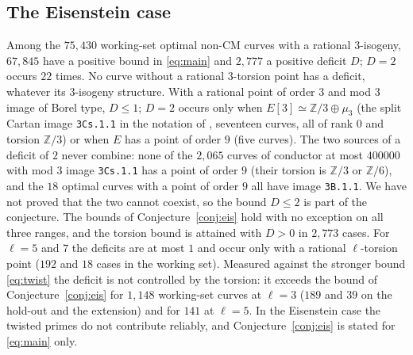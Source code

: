 \documentclass[11pt]{amsart}
\theoremstyle{definition}
\newcommand{\Z}{\mathbb{Z}}
\begin{document}
\subsection{The Eisenstein case}\label{sec:eis}
Among the $75{,}430$ working-set optimal non-CM curves with a rational $3$-isogeny, $67{,}845$ have a positive bound in \eqref{eq:main} and $2{,}777$ a positive deficit $D$; $D=2$ occurs $22$ times. No curve without a rational $3$-torsion point has a deficit, whatever its $3$-isogeny structure. With a rational point of order $3$ and mod $3$ image of Borel type, $D\le1$; $D=2$ occurs only when $E[3]\simeq\Z/3\oplus\mu_3$ (the split Cartan image \texttt{3Cs.1.1} in the notation of \cite{Sutherland16}, seventeen curves, all of rank $0$ and torsion $\Z/3$) or when $E$ has a point of order $9$ (five curves). The two sources of a deficit of $2$ never combine: none of the $2{,}065$ curves of conductor at most $400000$ with mod $3$ image \texttt{3Cs.1.1} has a point of order $9$ (their torsion is $\Z/3$ or $\Z/6$), and the $18$ optimal curves with a point of order $9$ all have image \texttt{3B.1.1}. We have not proved that the two cannot coexist, so the bound $D\le2$ is part of the conjecture. The bounds of Conjecture~\ref{conj:eis} hold with no exception on all three ranges, and the torsion bound is attained with $D>0$ in $2{,}773$ cases. For $\ell=5$ and $7$ the deficits are at most $1$ and occur only with a rational $\ell$-torsion point ($192$ and $18$ cases in the working set). Measured against the stronger bound \eqref{eq:twist} the deficit is not controlled by the torsion: it exceeds the bound of Conjecture~\ref{conj:eis} for $1{,}148$ working-set curves at $\ell=3$ ($189$ and $39$ on the hold-out and the extension) and for $141$ at $\ell=5$. In the Eisenstein case the twisted primes do not contribute reliably, and Conjecture~\ref{conj:eis} is stated for \eqref{eq:main} only.
\end{document}
